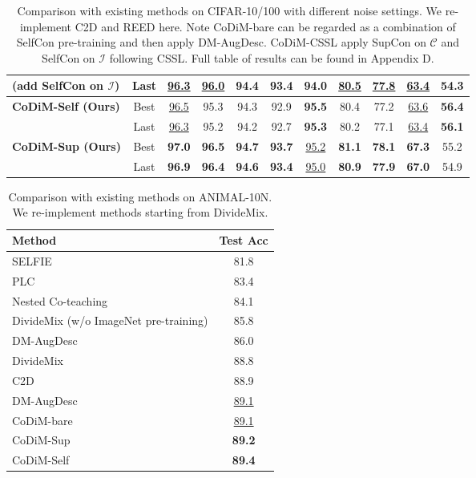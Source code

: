 \documentclass[letterpaper]{article} \usepackage{aaai22}  \usepackage{times}  \usepackage{helvet}  \usepackage{courier}  \usepackage[hyphens]{url}  \usepackage{graphicx} \usepackage{subfigure}
\begin{document}
\begin{table*}[h]
\begin{center}
\begin{tabular}{lcccccccccc}
(add SelfCon on $\mathcal{I}$)& Last & \underline{96.3} & \underline{96.0} & 94.4 & 93.4 & 94.0 & \underline{80.5} & \underline{77.8} & \underline{63.4} & 54.3 \\
\hline
\hline
\multirow{2}{*}{\textbf{CoDiM-Self (Ours)}} & Best & \underline{96.5} & 95.3 & 94.3 & 92.9 & \textbf{95.5} & 80.4 & 77.2 & \underline{63.6} & \textbf{56.4} \\
& Last & \underline{96.3} & 95.2 & 94.2 & 92.7 & \textbf{95.3} & 80.2 & 77.1 & \underline{63.4} & \textbf{56.1} \\
\hline
\multirow{2}{*}{\textbf{CoDiM-Sup (Ours)}} & Best & \textbf{97.0} & \textbf{96.5} & \textbf{94.7} & \textbf{93.7} & \underline{95.2} & \textbf{81.1} & \textbf{78.1} & \textbf{67.3} & 55.2 \\
 & Last & \textbf{96.9} & \textbf{96.4} & \textbf{94.6} & \textbf{93.4} & \underline{95.0} & \textbf{80.9} & \textbf{77.9} & \textbf{67.0} & 54.9 \\
\hline
\end{tabular}
\end{center}
\caption{Comparison with existing methods on CIFAR-10/100 with different noise settings. We re-implement C2D and REED here. Note CoDiM-bare can be regarded as a combination of SelfCon pre-training and then apply DM-AugDesc. CoDiM-CSSL apply SupCon on $\mathcal{C}$ and SelfCon on $\mathcal{I}$ following CSSL. Full table of results can be found in Appendix D.}
\label{tab:table2}
\end{table*}
\begin{table}[h]
\begin{center}
\begin{tabular}{lc}
\hline
Method & Test Acc \\
\hline
SELFIE \cite{song2019selfie} & 81.8 \\
PLC \cite{zhang2020learning} & 83.4 \\
Nested Co-teaching \cite{chen2021boosting} & 84.1 \\
DivideMix (w/o ImageNet pre-training) & 85.8 \\
DM-AugDesc \cite{nishi2021augmentation}& 86.0 \\
DivideMix \cite{li2020dividemix} & 88.8\\
C2D \cite{zheltonozhskii2021contrast} & 88.9\\
DM-AugDesc \cite{nishi2021augmentation}& \underline{89.1} \\
\hline
CoDiM-bare & \underline{89.1} \\
CoDiM-Sup & \textbf{89.2} \\
CoDiM-Self & \textbf{89.4} \\
\hline
\end{tabular}
\end{center}
\caption{Comparison with existing methods on ANIMAL-10N. We re-implement methods starting from DivideMix.}
\label{tab:table3}
\end{table}
\end{document}
